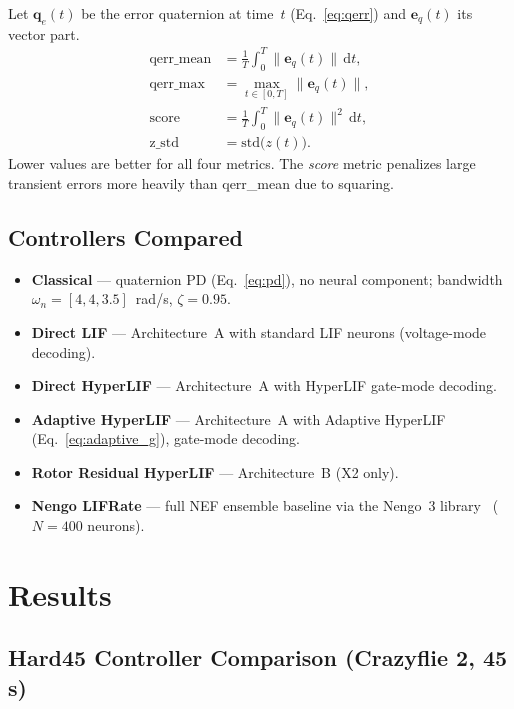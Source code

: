 \documentclass[conference]{IEEEtran}
\begin{document}
Let $\mathbf{q}_e(t)$ be the error quaternion at time~$t$ (Eq.~\eqref{eq:qerr})
and $\mathbf{e}_q(t)$ its vector part.
\begin{align}
  \text{qerr\_mean} &= \frac{1}{T}\int_0^T \|\mathbf{e}_q(t)\|\,\mathrm{d}t,
    \label{eq:qerr_mean}\\
  \text{qerr\_max}  &= \max_{t\in[0,T]} \|\mathbf{e}_q(t)\|,
    \label{eq:qerr_max}\\
  \text{score}      &= \frac{1}{T}\int_0^T \|\mathbf{e}_q(t)\|^2\,\mathrm{d}t,
    \label{eq:score}\\
  \text{z\_std}     &= \mathrm{std}\bigl(z(t)\bigr).
    \label{eq:zstd}
\end{align}
Lower values are better for all four metrics.
The \textit{score} metric penalizes large transient errors more heavily than
qerr\_mean due to squaring.

\subsection{Controllers Compared}

\begin{itemize}
  \item \textbf{Classical} — quaternion PD (Eq.~\eqref{eq:pd}), no neural
        component; bandwidth $\omega_n=[4,4,3.5]$~rad/s, $\zeta=0.95$.
  \item \textbf{Direct LIF} — Architecture~A with standard LIF neurons
        (voltage-mode decoding).
  \item \textbf{Direct HyperLIF} — Architecture~A with HyperLIF gate-mode
        decoding.
  \item \textbf{Adaptive HyperLIF} — Architecture~A with Adaptive HyperLIF
        (Eq.~\eqref{eq:adaptive_g}), gate-mode decoding.
  \item \textbf{Rotor Residual HyperLIF} --- Architecture~B (X2 only).
  \item \textbf{Nengo LIFRate} --- full NEF ensemble baseline via the
        Nengo~3 library~\cite{bekolay2014nengo} ($N{=}400$ neurons).
\end{itemize}

\section{Results}
\label{sec:results}

\subsection{Hard45 Controller Comparison (Crazyflie 2, 45 s)}
\end{document}
